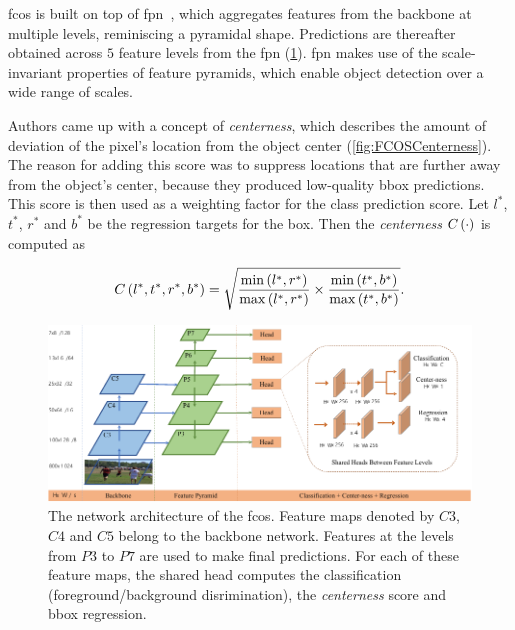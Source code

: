 \Gls{fcos} is built on top of \gls{fpn}~\cite{Li2019}, which aggregates features from the backbone at multiple levels, reminiscing a pyramidal shape. Predictions are thereafter obtained across $5$ feature levels from the \gls{fpn} (\cref{fig:FCOSFeaturePyramid}). \gls{fpn} makes use of the scale-invariant properties of feature pyramids, which enable object detection over a wide range of scales.

Authors came up with a concept of \emph{centerness}, which describes the amount of deviation of the pixel's location from the object center (\cref{fig:FCOSCenterness}). The reason for adding this score was to suppress locations that are further away from the object's center, because they produced low-quality \gls{bbox} predictions. This score is then used as a weighting factor for the class prediction score. Let $l^*$, $t^*$, $r^*$ and $b^*$ be the regression targets for the box. Then the \emph{centerness} ${C} \left( \cdot \right)$ is computed as

\begin{equation}
    \label{eq:CenternessDetection}
    {C} \left( l^*, t^*, r^*, b^* \right) =
    \sqrt{
        \frac{
            {\min} \left( l^*, r^* \right)
        }{
            {\max} \left( l^*, r^* \right)
        }
        \times
        \frac{
            {\min} \left( t^*, b^* \right)
        }{
            {\max} \left( t^*, b^* \right)
        }
    }.
\end{equation}


\begin{figure}[t]
    \centerline{\includegraphics[width=\linewidth]{figures/theoretical_foundations/fcos_feature_pyramid.pdf}}
    \caption[\Gls{fcos} architecture]{The network architecture of the \gls{fcos}. Feature maps denoted by $C3$, $C4$ and $C5$ belong to the backbone network. Features at the levels from $P3$ to $P7$ are used to make final predictions. For each of these feature maps, the shared head computes the classification (foreground/background disrimination), the \emph{centerness} score and \gls{bbox} regression. }
    \label{fig:FCOSFeaturePyramid}
\end{figure}

